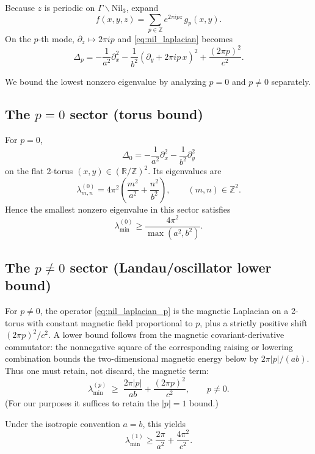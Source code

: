 \documentclass[11pt]{article}
\begin{document}
Because $z$ is periodic on $\Gamma\backslash\mathrm{Nil}_3$, expand
\[
f(x,y,z)=\sum_{p\in\mathbb{Z}} e^{2\pi i p z}\,g_p(x,y).
\]
On the $p$-th mode, $\partial_z\mapsto 2\pi i p$ and \eqref{eq:nil_laplacian} becomes
\begin{equation}
\Delta_p
=
-\frac{1}{a^2}\partial_x^2
-\frac{1}{b^2}(\partial_y + 2\pi i p\,x)^2
+\frac{(2\pi p)^2}{c^2}.
\label{eq:nil_laplacian_p}
\end{equation}

We bound the lowest nonzero eigenvalue by analyzing $p=0$ and $p\neq 0$ separately.

\subsection{The \texorpdfstring{$p=0$}{p=0} sector (torus bound)}

For $p=0$,
\[
\Delta_0 = -\frac{1}{a^2}\partial_x^2-\frac{1}{b^2}\partial_y^2
\]
on the flat 2-torus $(x,y)\in(\mathbb{R}/\mathbb{Z})^2$.
Its eigenvalues are
\[
\lambda^{(0)}_{m,n} = 4\pi^2\left(\frac{m^2}{a^2}+\frac{n^2}{b^2}\right),
\qquad (m,n)\in\mathbb{Z}^2.
\]
Hence the smallest nonzero eigenvalue in this sector satisfies
\begin{equation}
\lambda_{\min}^{(0)} \ge \frac{4\pi^2}{\max(a^2,b^2)}.
\label{eq:lambda_p0}
\end{equation}

\subsection{The \texorpdfstring{$p\neq 0$}{p not equal to 0} sector
(Landau/oscillator lower bound)}

For $p\neq 0$, the operator \eqref{eq:nil_laplacian_p} is the magnetic Laplacian on a 2-torus
with constant magnetic field proportional to $p$, plus a strictly positive shift $(2\pi p)^2/c^2$.
A lower bound follows from the magnetic covariant-derivative commutator:
the nonnegative square of the corresponding raising or lowering combination
bounds the two-dimensional magnetic energy below by $2\pi|p|/(ab)$.
Thus one must retain, not discard, the magnetic term:
\begin{equation}
\lambda_{\min}^{(p)} \;\ge\; \frac{2\pi |p|}{ab} + \frac{(2\pi p)^2}{c^2},
\qquad p\neq 0.
\label{eq:lambda_pnonzero}
\end{equation}
(For our purposes it suffices to retain the $|p|=1$ bound.)

Under the isotropic convention $a=b$, this yields
\begin{equation}
\lambda_{\min}^{(1)} \ge \frac{2\pi}{a^2}+\frac{4\pi^2}{c^2}.
\label{eq:lambda_p1}
\end{equation}
\end{document}
